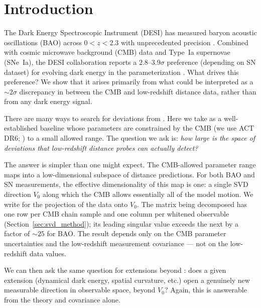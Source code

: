 
\section{Introduction}
\label{sec:intro}

The Dark Energy Spectroscopic Instrument (DESI) has measured baryon acoustic oscillations (BAO) across $0 < z < 2.3$ with unprecedented precision \citep{DESI_DR2_BAO}. Combined with cosmic microwave background (CMB) data and Type~Ia supernovae (SNe~Ia), the DESI collaboration reports a $2.8$--$3.9\sigma$ preference (depending on SN dataset) for evolving dark energy in the \wowa parameterization \citep{DESI_DR2_cosmo}. What drives this preference? We show that it arises primarily from what could be interpreted as a $\sim 2\sigma$ discrepancy in \omh between the CMB and low-redshift distance data, rather than from any dark energy signal.


There are many ways to search for deviations from \LCDM. Here we take \LCDM as a well-established baseline whose parameters are constrained by the CMB (we use ACT DR6; \citealt{ACT_DR6}) to a small allowed range. The question we ask is: \emph{how large is the space of deviations that low-redshift distance probes can actually detect?}

The answer is simpler than one might expect. The CMB-allowed \LCDM parameter range maps into a low-dimensional subspace of distance predictions. For both BAO and SN measurements, the effective dimensionality of this map is one: a single SVD direction $V_0$ along which the CMB allows essentially all of the model motion. We write \czero for the projection of the data onto $V_0$. The matrix being decomposed has one row per CMB chain sample and one column per whitened observable (Section~\ref{sec:svd_method}); its leading singular value exceeds the next by a factor of $\sim 25$ for BAO. The result depends only on the CMB parameter uncertainties and the low-redshift measurement covariance --- not on the low-redshift data values.

We can then ask the same question for extensions beyond \LCDM: does a given extension (dynamical dark energy, spatial curvature, etc.) open a genuinely new measurable direction in observable space, beyond $V_0$? Again, this is answerable from the theory and covariance alone.

